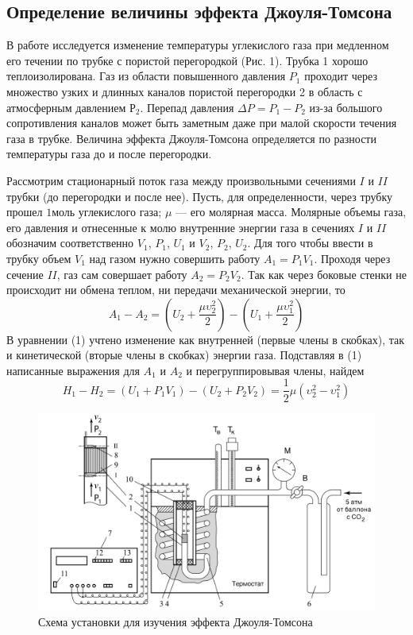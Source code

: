 \documentclass[a4paper,12pt]{article}
\theoremstyle{plain} %
\theoremstyle{definition} %
\theoremstyle{remark} %
\begin{document}
	\subsection{Определение величины эффекта Джоуля-Томсона}
	В работе исследуется изменение температуры углекислого газа при медленном его течении по трубке с пористой перегородкой (Рис. 1). Трубка 1 хорошо теплоизолирована. Газ из области повышенного давления $P_1$ проходит через множество узких и длинных каналов пористой перегородки 2 в область с атмосферным давлением $Р_2$. Перепад давления $\Delta P = P_1 -P_2$ из-за большого сопротивления каналов может быть заметным даже при малой скорости течения газа в трубке. Величина эффекта Джоуля-Томсона определяется по разности температуры газа до и после перегородки.
	
	Рассмотрим стационарный поток газа между произвольными сечениями $I$ и $II$ трубки (до перегородки и после нее). Пусть, для определенности, через трубку прошел $1 \text{моль}$ углекислого газа; $\mu$ — его молярная масса. Молярные объемы газа, его давления и отнесенные к молю внутренние энергии газа в сечениях  $I$ и $II$ обозначим соответственно $V_1$, $P_1$, $U_1$ и $V_2$, $P_2$, $U_2$. Для того чтобы ввести в трубку объем $V_1$ над газом нужно совершить работу $A_1 = P_1 V_1$. Проходя через сечение $II$, газ сам совершает работу $A_2 = P_2 V_2$. Так как через боковые стенки не происходит ни обмена теплом, ни передачи механической энергии, то
	\begin{equation}
	A_1 - A_2 = \left(U_2 + \frac{\mu \upsilon_2^2}{2}\right) - \left(U_1 + \frac{\mu \upsilon_1^2}{2}\right)
	\end{equation}
	В уравнении (1) учтено изменение как внутренней (первые члены в скобках), так и кинетической (вторые члены в скобках) энергии газа. Подставляя в (1) написанные выражения для $A_1$ и $A_2$ и перегруппировывая члены, найдем
	\begin{equation}
	H_1 - H_2 = (U_1 + P_1V_1)-(U_2+P_2V_2) = \frac{1}{2} \mu (\upsilon_2^2-\upsilon_1^2)
	\end{equation}
	\begin{figure}[H]
		\begin{center}
			\includegraphics[width=\linewidth]{1}
			\captionsetup{justification=centering}
			\caption{Схема установки для изучения эффекта Джоуля-Томсона}
		\end{center}
	\end{figure}
\end{document}
